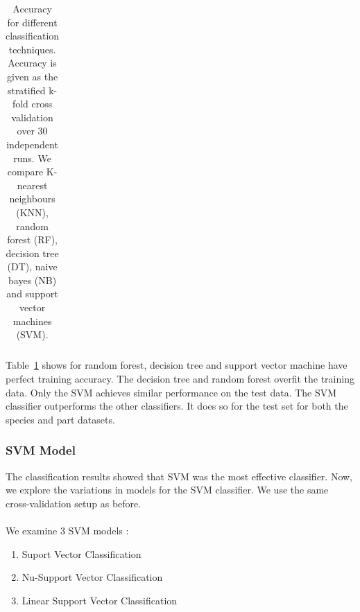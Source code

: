\documentclass{article}
\begin{document}
\begin{table}[htb]
\begin{tabular}{|l|l|l|l|l|}
    \hline
  \end{tabular}
  \caption{
    Accuracy for different classification techniques.
    Accuracy is given as the stratified k-fold cross validation over 30 independent runs.
    We compare K-nearest neighbours (KNN), random forest (RF), decision tree (DT), naive bayes (NB) and support vector machines (SVM).}
  \label{t:classification}
\end{table}

Table~\ref{t:classification} shows for random forest, decision tree and support vector machine have perfect training accuracy.
The decision tree and random forest overfit the training data.
Only the SVM achieves similar performance on the test data.
The SVM classifier outperforms the other classifiers.
It does so for the test set for both the species and part datasets.

\subsubsection{SVM Model}
\label{sec:results-classification-svm}

The classification results showed that SVM was the most effective classifier.
Now, we explore the variations in models for the SVM classifier.
We use the same cross-validation setup as before.
\\\\
We examine 3 SVM models \cite{sklearn2021feature}:

\begin{enumerate}
  \item Suport Vector Classification \cite{cortes1995support}
  \item Nu-Support Vector Classification \cite{scholkopf2000new}
  \item Linear Support Vector Classification
\end{enumerate}
\end{document}

